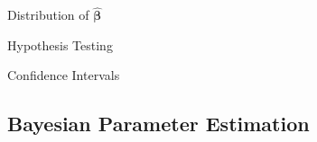 \documentclass[11pt,a4paper]{article}
\begin{document}
\begin{theorem}{Distribution of $\hat{\pmb\beta}$}

\end{theorem}

\begin{remark}{Hypothesis Testing}

\end{remark}

\begin{remark}{Confidence Intervals}

\end{remark}

\subsection{Bayesian Parameter Estimation}

\begin{definition}{}

\end{definition}
\end{document}
